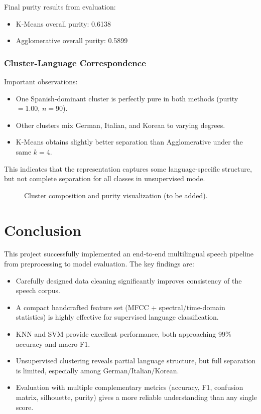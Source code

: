 \documentclass[a4paper,14pt]{extarticle}
\begin{document}
Final purity results from evaluation:
\begin{itemize}
    \item K-Means overall purity: 0.6138
    \item Agglomerative overall purity: 0.5899
\end{itemize}

\subsubsection{Cluster-Language Correspondence}
Important observations:
\begin{itemize}
    \item One Spanish-dominant cluster is perfectly pure in both methods (purity \(=1.00\), \(n=90\)).
    \item Other clusters mix German, Italian, and Korean to varying degrees.
    \item K-Means obtains slightly better separation than Agglomerative under the same \(k=4\).
\end{itemize}

This indicates that the representation captures some language-specific structure, but not complete separation for all classes in unsupervised mode.

\begin{figure}[h]
    \centering
    \caption{Cluster composition and purity visualization (to be added).}
    \label{fig:cluster_purity_placeholder}
\end{figure}

\newpage
\section{Conclusion}
This project successfully implemented an end-to-end multilingual speech pipeline from preprocessing to model evaluation. The key findings are:
\begin{itemize}
    \item Carefully designed data cleaning significantly improves consistency of the speech corpus.
    \item A compact handcrafted feature set (MFCC + spectral/time-domain statistics) is highly effective for supervised language classification.
    \item KNN and SVM provide excellent performance, both approaching 99\% accuracy and macro F1.
    \item Unsupervised clustering reveals partial language structure, but full separation is limited, especially among German/Italian/Korean.
    \item Evaluation with multiple complementary metrics (accuracy, F1, confusion matrix, silhouette, purity) gives a more reliable understanding than any single score.
\end{itemize}
\end{document}
